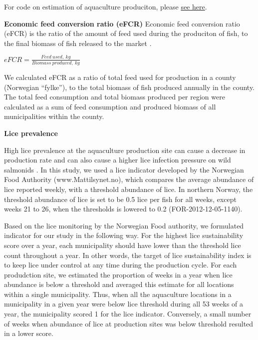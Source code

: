 \documentclass[
]{book}
\begin{document}
For code on estimation of aquaculture produciton, please
\href{https://ohi-norway.github.io/nor-prep/prep/food_provision/Mariculture/total_aquaculture_production_and_efcr_newdata_jan2020.html}{see here}.

\textbf{Economic feed conversion ratio (eFCR)}
Economic feed conversion ratio (eFCR) is the ratio of the amount of feed used during the produciton of fish, to the final biomass of fish released to the market \citep{boyd2007indicators}.

\(eFCR = \frac{Feed \ used,\ kg}{Biomass\ produced,\ kg}\)

We calculated eFCR as a ratio of total feed used for production in a county (Norwegian ``fylke''), to the total biomass of fish produced annually in the county. The total feed consumption and total biomass produced per region were calculated as a sum of feed consumption and produced biomass of all municipalities within the county.

\textbf{Lice prevalence}

High lice prevalence at the aquaculture production site can cause a decrease in production rate and can also cause a higher lice infection pressure on wild salmonids \citep{bjorn2001salmon, nilsen2017vurdering}.
In this study, we used a lice indicator developed by the Norwegian Food Authority (www.Mattilsynet.no), which compares the average abundance of lice reported weekly, with a threshold abundance of lice. In northern Norway, the threshold abundance of lice is set to be 0.5 lice per fish for all weeks, except weeks 21 to 26, when the thresholds is lowered to 0.2 (FOR-2012-12-05-1140).

Based on the lice monitoring by the Norwegian Food authority, we formulated indicator for our study in the following way. For the highest lice sustainability score over a year, each municipality should have lower than the threshold lice count throughout a year. In other words, the target of lice sustainability index is to keep lice under control at any time during the production cycle. For each produdction site, we estimated the proportion of weeks in a year when lice abundance is below a threshold and averaged this estimate for all locations within a single municipality. Thus, when all the aquaculture locations in a municipality in a given year were below lice threshold during all 53 weeks of a year, the municipality scored 1 for the lice indicator. Conversely, a small number of weeks when abundance of lice at production sites was below threshold resulted in a lower score.
\end{document}
